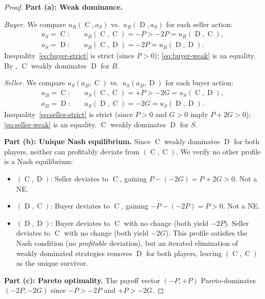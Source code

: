 \documentclass[11pt,a4paper]{article}
\theoremstyle{definition}
\theoremstyle{remark}
\newcommand{\pay}{P}           %
\newcommand{\cumval}{G}        %
\newcommand{\ub}{u_B}          %
\newcommand{\us}{u_S}          %
\DeclareMathOperator{\Coop}{C}
\DeclareMathOperator{\Def}{D}
\begin{document}
\begin{proof}
\textbf{Part (a): Weak dominance.}

\emph{Buyer.} We compare $\ub(\Coop, a_S)$ vs.\
$\ub(\Def, a_S)$ for each seller action:
\begin{align}
  a_S = \Coop: &\quad \ub(\Coop, \Coop) = -\pay > -2\pay = \ub(\Def, \Coop),
    \label{eq:buyer-strict} \\
  a_S = \Def: &\quad \ub(\Coop, \Def) = -2\pay = \ub(\Def, \Def).
    \label{eq:buyer-weak}
\end{align}
Inequality~\eqref{eq:buyer-strict} is strict (since $\pay > 0$);
\eqref{eq:buyer-weak} is an equality. By \Cref{def:dominance}, $\Coop$
weakly dominates $\Def$ for $B$.

\emph{Seller.} We compare $\us(a_B, \Coop)$ vs.\
$\us(a_B, \Def)$ for each buyer action:
\begin{align}
  a_B = \Coop: &\quad \us(\Coop, \Coop) = +\pay > -2\cumval = \us(\Coop, \Def),
    \label{eq:seller-strict} \\
  a_B = \Def: &\quad \us(\Def, \Coop) = -2\cumval = \us(\Def, \Def).
    \label{eq:seller-weak}
\end{align}
Inequality~\eqref{eq:seller-strict} is strict (since $\pay > 0$ and
$\cumval > 0$ imply $\pay + 2\cumval > 0$);
\eqref{eq:seller-weak} is an equality. $\Coop$ weakly dominates $\Def$
for $S$.

\textbf{Part (b): Unique Nash equilibrium.}
Since $\Coop$ weakly dominates $\Def$ for both players, neither can
profitably deviate from $(\Coop, \Coop)$. We verify no other profile
is a Nash equilibrium:
\begin{itemize}
  \item $(\Coop, \Def)$: Seller deviates to $\Coop$, gaining
    $\pay - (-2\cumval) = \pay + 2\cumval > 0$. Not a NE.
  \item $(\Def, \Coop)$: Buyer deviates to $\Coop$, gaining
    $-\pay - (-2\pay) = \pay > 0$. Not a NE.
  \item $(\Def, \Def)$: Buyer deviates to $\Coop$ with no change
    (both yield $-2\pay$). Seller deviates to $\Coop$ with no change
    (both yield $-2\cumval$). This profile satisfies the Nash
    condition (no \emph{profitable} deviation), but an iterated
    elimination of weakly dominated strategies removes $\Def$ for
    both players, leaving $(\Coop, \Coop)$ as the unique survivor.
\end{itemize}

\textbf{Part (c): Pareto optimality.}
The payoff vector $(-\pay, +\pay)$ Pareto-dominates $(-2\pay, -2\cumval)$
since $-\pay > -2\pay$ and $+\pay > -2\cumval$.
\end{proof}
\end{document}
